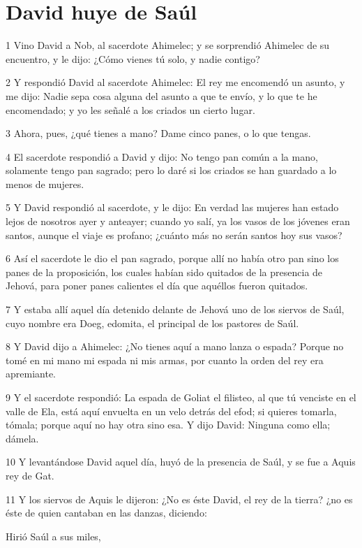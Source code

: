 \section*{David huye de Saúl}

\par 1 Vino David a Nob, al sacerdote Ahimelec; y se sorprendió Ahimelec de su encuentro, y le dijo: ¿Cómo vienes tú solo, y nadie contigo?
\par 2 Y respondió David al sacerdote Ahimelec: El rey me encomendó un asunto, y me dijo: Nadie sepa cosa alguna del asunto a que te envío, y lo que te he encomendado; y yo les señalé a los criados un cierto lugar.
\par 3 Ahora, pues, ¿qué tienes a mano? Dame cinco panes, o lo que tengas.
\par 4 El sacerdote respondió a David y dijo: No tengo pan común a la mano, solamente tengo pan sagrado; pero lo daré si los criados se han guardado a lo menos de mujeres.
\par 5 Y David respondió al sacerdote, y le dijo: En verdad las mujeres han estado lejos de nosotros ayer y anteayer; cuando yo salí, ya los vasos de los jóvenes eran santos, aunque el viaje es profano; ¿cuánto más no serán santos hoy sus vasos?
\par 6 Así el sacerdote le dio el pan sagrado, porque allí no había otro pan sino los panes de la proposición, los cuales habían sido quitados de la presencia de Jehová, para poner panes calientes el día que aquéllos fueron quitados.
\par 7 Y estaba allí aquel día detenido delante de Jehová uno de los siervos de Saúl, cuyo nombre era Doeg, edomita, el principal de los pastores de Saúl.
\par 8 Y David dijo a Ahimelec: ¿No tienes aquí a mano lanza o espada? Porque no tomé en mi mano mi espada ni mis armas, por cuanto la orden del rey era apremiante.
\par 9 Y el sacerdote respondió: La espada de Goliat el filisteo, al que tú venciste en el valle de Ela, está aquí envuelta en un velo detrás del efod; si quieres tomarla, tómala; porque aquí no hay otra sino esa. Y dijo David: Ninguna como ella; dámela.
\par 10 Y levantándose David aquel día, huyó de la presencia de Saúl, y se fue a Aquis rey de Gat.
\par 11 Y los siervos de Aquis le dijeron: ¿No es éste David, el rey de la tierra? ¿no es éste de quien cantaban en las danzas, diciendo:
\par Hirió Saúl a sus miles,

